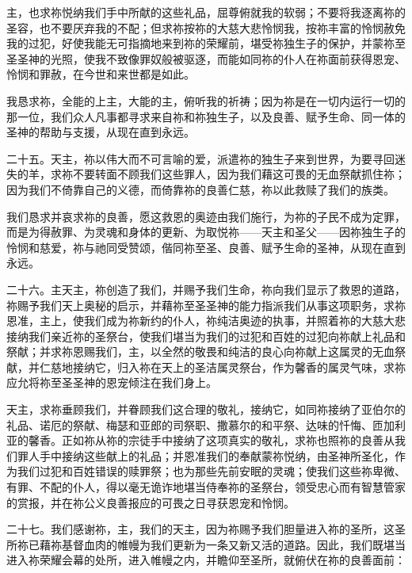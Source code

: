 主，也求祢悦纳我们手中所献的这些礼品，屈尊俯就我的软弱；不要将我逐离祢的圣容，也不要厌弃我的不配；但求祢按祢的大慈大悲怜悯我，按祢丰富的怜悯赦免我的过犯，好使我能无可指摘地来到祢的荣耀前，堪受祢独生子的保护，并蒙祢至圣圣神的光照，使我不致像罪奴般被驱逐，而能如同祢的仆人在祢面前获得恩宠、怜悯和罪赦，在今世和来世都是如此。\par

我恳求祢，全能的上主，大能的主，俯听我的祈祷；因为祢是在一切内运行一切的那一位，我们众人凡事都寻求来自祢和祢独生子，以及良善、赋予生命、同一体的圣神的帮助与支援，从现在直到永远。\par

二十五。天主，祢以伟大而不可言喻的爱，派遣祢的独生子来到世界，为要寻回迷失的羊，求祢不要转面不顾我们这些罪人，因为我们藉这可畏的无血祭献抓住祢；因为我们不倚靠自己的义德，而倚靠祢的良善仁慈，祢以此救赎了我们的族类。\par

我们恳求并哀求祢的良善，愿这救恩的奥迹由我们施行，为祢的子民不成为定罪，而是为得赦罪、为灵魂和身体的更新、为取悦祢——天主和圣父——因祢独生子的怜悯和慈爱，祢与祂同受赞颂，偕同祢至圣、良善、赋予生命的圣神，从现在直到永远。\par

二十六。主天主，祢创造了我们，并赐予我们生命，祢向我们显示了救恩的道路，祢赐予我们天上奥秘的启示，并藉祢至圣圣神的能力指派我们从事这项职务，求祢恩准，主上，使我们成为祢新约的仆人，祢纯洁奥迹的执事，并照着祢的大慈大悲接纳我们亲近祢的圣祭台，使我们堪当为我们的过犯和百姓的过犯向祢献上礼品和祭献；并求祢恩赐我们，主，以全然的敬畏和纯洁的良心向祢献上这属灵的无血祭献，并仁慈地接纳它，归入祢在天上的圣洁属灵祭台，作为馨香的属灵气味，求祢应允将祢至圣圣神的恩宠倾注在我们身上。\par

天主，求祢垂顾我们，并眷顾我们这合理的敬礼，接纳它，如同祢接纳了亚伯尔的礼品、诺厄的祭献、梅瑟和亚郎的司祭职、撒慕尔的和平祭、达味的忏悔、匝加利亚的馨香。正如祢从祢的宗徒手中接纳了这项真实的敬礼，求祢也照祢的良善从我们罪人手中接纳这些献上的礼品；并恩准我们的奉献蒙祢悦纳，由圣神所圣化，作为我们过犯和百姓错误的赎罪祭；也为那些先前安眠的灵魂；使我们这些祢卑微、有罪、不配的仆人，得以毫无诡诈地堪当侍奉祢的圣祭台，领受忠心而有智慧管家的赏报，并在祢公义良善报应的可畏之日寻获恩宠和怜悯。\par

\par

二十七。我们感谢祢，主，我们的天主，因为祢赐予我们胆量进入祢的圣所，这圣所祢已藉祢基督血肉的帷幔为我们更新为一条又新又活的道路。因此，我们既堪当进入祢荣耀会幕的处所，进入帷幔之内，并瞻仰至圣所，就俯伏在祢的良善面前：\par

